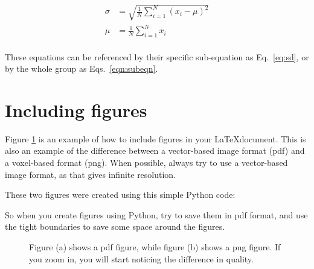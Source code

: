 \begin{subequations}
\begin{align}
    \sigma &= \sqrt{\frac{1}{N} \sum_{i=1}^N (x_i - \mu)^2}
    \label{eq:sd}\\ 
    \mu &= \frac{1}{N} \sum_{i=1}^N x_i \label{eq:mean}
\end{align}
\label{eqn:subeqn}
\end{subequations}\\
These equations can be referenced by their specific sub-equation as Eq.~\eqref{eq:sd}, or by the whole group as Eqs.~\eqref{eqn:subeqn}.


\section{Including figures}

Figure \ref{fig:qualityDiff} is an example of how to include figures in your \LaTeX document. This is also an example of the difference between a vector-based image format (pdf) and a voxel-based format (png). When possible, always try to use a vector-based image format, as that gives infinite resolution.

These two figures were created using this simple Python code:



So when you create figures using Python, try to save them in pdf format, and use the tight boundaries to save some space around the figures.

\begin{figure}[H]
  \centering
  \quad
  \caption{Figure (a) shows a pdf figure, while figure (b) shows a png figure. If you zoom in, you will start noticing the difference in quality.}
\label{fig:qualityDiff}
\end{figure}

